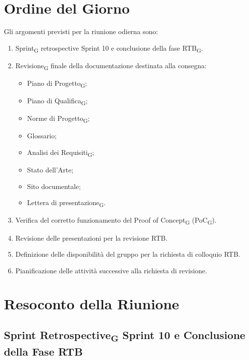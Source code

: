 \section{Ordine del Giorno}

Gli argomenti previsti per la riunione odierna sono:

\begin{enumerate}
    \item Sprint\textsubscript{G} retrospective Sprint 10 e conclusione della fase RTB\textsubscript{G}.
    \item Revisione\textsubscript{G} finale della documentazione destinata alla consegna:
    \begin{itemize}
        \item Piano di Progetto\textsubscript{G};
        \item Piano di Qualifica\textsubscript{G};
        \item Norme di Progetto\textsubscript{G};
        \item Glossario;
        \item Analisi dei Requisiti\textsubscript{G};
        \item Stato dell'Arte;
        \item Sito documentale;
        \item Lettera di presentazione\textsubscript{G}.
    \end{itemize}
    \item Verifica del corretto funzionamento del Proof of Concept\textsubscript{G} (PoC\textsubscript{G}).
    \item Revisione delle presentazioni per la revisione RTB.
    \item Definizione delle disponibilità del gruppo per la richiesta di colloquio RTB.
    \item Pianificazione delle attività successive alla richiesta di revisione.
\end{enumerate}


\section{Resoconto della Riunione}

\subsection{Sprint Retrospective\textsubscript{G} Sprint 10 e Conclusione della Fase RTB}

